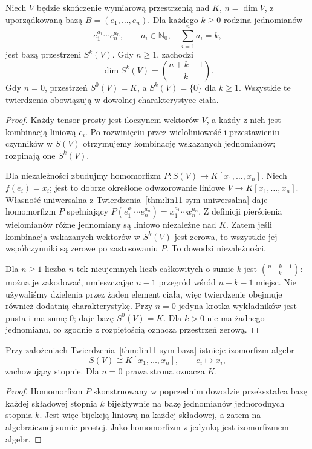 \begin{twierdzenie}
\label{thm:lin11-sym-baza}
Niech \(V\) będzie skończenie
wymiarową przestrzenią nad \(K\),
\(n=\dim V\), z uporządkowaną
bazą \(B=(e_1,\ldots,e_n)\).
Dla każdego \(k\ge0\)
rodzina jednomianów
\[
 e_1^{a_1}\cdots e_n^{a_n},
 \qquad a_i\in\mathbb N_0,\quad
 \sum_{i=1}^n a_i=k,
\]
jest bazą przestrzeni \(S^k(V)\).
Gdy \(n\ge1\), zachodzi
\[
 \dim S^k(V)=\binom{n+k-1}{k}.
\]
Gdy \(n=0\), przestrzeń \(S^0(V)=K\),
a \(S^k(V)=\{0\}\) dla \(k\ge1\).
Wszystkie te twierdzenia obowiązują
w dowolnej charakterystyce ciała.
\end{twierdzenie}
\begin{proof}
Każdy tensor prosty jest iloczynem
wektorów \(V\), a każdy z nich
jest kombinacją liniową \(e_i\).
Po rozwinięciu przez wieloliniowość
i przestawieniu czynników w \(S(V)\)
otrzymujemy kombinację wskazanych
jednomianów; rozpinają one \(S^k(V)\).

Dla niezależności zbudujmy
homomorfizm
\(P\colon S(V)\to K[x_1,\ldots,x_n]\).
Niech \(f(e_i)=x_i\);
jest to dobrze określone
odwzorowanie liniowe \(V\to K[x_1,\ldots,x_n]\).
Własność uniwersalna
z Twierdzenia~\ref{thm:lin11-sym-uniwersalna}
daje homomorfizm \(P\)
spełniający
\(P(e_1^{a_1}\cdots e_n^{a_n})
=x_1^{a_1}\cdots x_n^{a_n}\).
Z definicji pierścienia
wielomianów różne jednomiany
są liniowo niezależne nad \(K\).
Zatem jeśli kombinacja wskazanych
wektorów w \(S^k(V)\) jest zerowa,
to wszystkie jej współczynniki
są zerowe po zastosowaniu \(P\).
To dowodzi niezależności.

Dla \(n\ge1\) liczba
\(n\)-tek nieujemnych liczb całkowitych
o sumie \(k\) jest
\(\binom{n+k-1}{k}\):
można je zakodować,
umieszczając \(n-1\) przegród
wśród \(n+k-1\) miejsc.
Nie używaliśmy dzielenia
przez żaden element ciała,
więc twierdzenie obejmuje
również dodatnią charakterystykę.
Przy \(n=0\) jedyna krotka
wykładników jest pusta
i ma sumę \(0\); daje
bazę \(S^0(V)=K\).
Dla \(k>0\) nie ma
żadnego jednomianu,
co zgodnie z rozpiętością
oznacza przestrzeń zerową.
\end{proof}

\begin{wniosek}
\label{cor:lin11-wielomiany}
Przy założeniach
Twierdzenia~\ref{thm:lin11-sym-baza}
istnieje izomorfizm algebr
\[
 S(V)\cong K[x_1,\ldots,x_n],
 \qquad e_i\longmapsto x_i,
\]
zachowujący stopnie.
Dla \(n=0\) prawa strona
oznacza \(K\).
\end{wniosek}
\begin{proof}
Homomorfizm \(P\) skonstruowany
w poprzednim dowodzie
przekształca bazę każdej
składowej stopnia \(k\)
bijektywnie na bazę jednomianów
jednorodnych stopnia \(k\).
Jest więc bijekcją liniową
na każdej składowej, a zatem
na algebraicznej sumie prostej.
Jako homomorfizm z jedynką
jest izomorfizmem algebr.
\end{proof}

